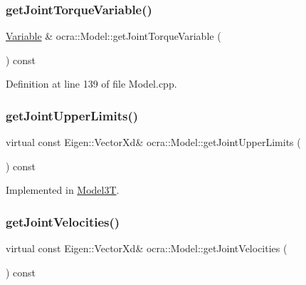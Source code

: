 \hypertarget{classocra_1_1Model_aa937c641a2a01e672824a3d4b16f4942}{}\label{classocra_1_1Model_aa937c641a2a01e672824a3d4b16f4942} 
\subsubsection{\texorpdfstring{get\+Joint\+Torque\+Variable()}{getJointTorqueVariable()}}
{\footnotesize\ttfamily \hyperlink{classocra_1_1Variable}{Variable} \& ocra\+::\+Model\+::get\+Joint\+Torque\+Variable (\begin{DoxyParamCaption}{ }\end{DoxyParamCaption}) const}



Definition at line 139 of file Model.\+cpp.

\hypertarget{classocra_1_1Model_a75caa887c8f27d8be8dc5a60ed1e1c41}{}\label{classocra_1_1Model_a75caa887c8f27d8be8dc5a60ed1e1c41} 
\subsubsection{\texorpdfstring{get\+Joint\+Upper\+Limits()}{getJointUpperLimits()}}
{\footnotesize\ttfamily virtual const Eigen\+::\+Vector\+Xd\& ocra\+::\+Model\+::get\+Joint\+Upper\+Limits (\begin{DoxyParamCaption}{ }\end{DoxyParamCaption}) const\hspace{0.3cm}{\ttfamily [pure virtual]}}



Implemented in \hyperlink{classModel3T_a5b2add8312e0251e43cd1027a6a72056}{Model3T}.

\hypertarget{classocra_1_1Model_a73b9bd94e98138145217526dbe23841a}{}\label{classocra_1_1Model_a73b9bd94e98138145217526dbe23841a} 
\subsubsection{\texorpdfstring{get\+Joint\+Velocities()}{getJointVelocities()}}
{\footnotesize\ttfamily virtual const Eigen\+::\+Vector\+Xd\& ocra\+::\+Model\+::get\+Joint\+Velocities (\begin{DoxyParamCaption}{ }\end{DoxyParamCaption}) const\hspace{0.3cm}{\ttfamily [pure virtual]}}



